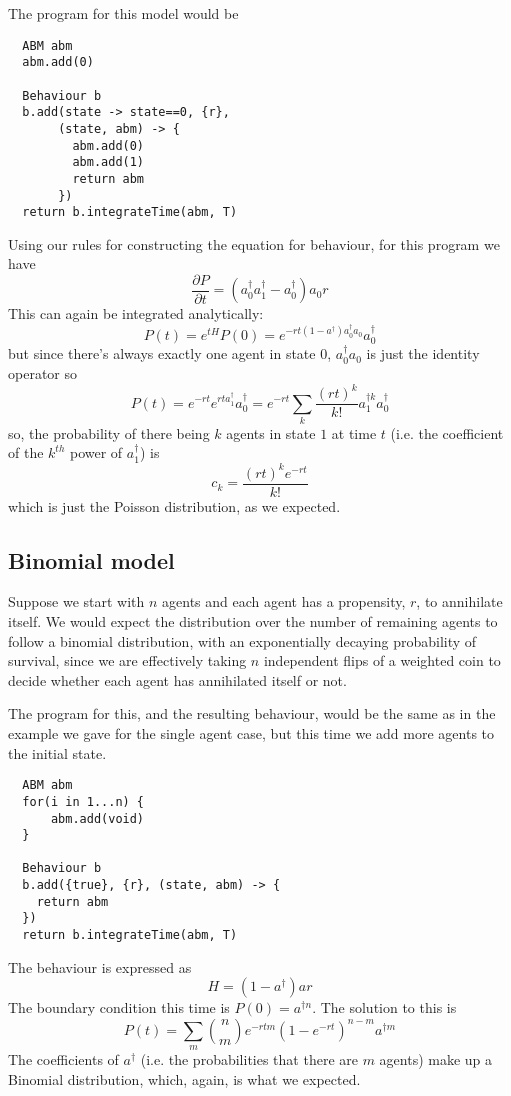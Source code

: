 \documentclass[letterpaper,twocolumn,10pt]{article}
\begin{document}
The program for this model would be

\begin{lstlisting}
  ABM abm
  abm.add(0)
  
  Behaviour b
  b.add(state -> state==0, {r}, 
       (state, abm) -> {
         abm.add(0)
         abm.add(1)
         return abm
       })
  return b.integrateTime(abm, T)
\end{lstlisting}
Using our rules for constructing the equation for behaviour, for this program we have
\[
\frac{\partial P}{\partial t} = (a_0^\dag a_1^\dag - a_0^\dag)a_0r
\]
This can again be integrated analytically:
\[
P(t) = e^{tH}P(0) = e^{-rt (1-a^\dag)a_0^\dag a_0}a_0^\dag
\]
but since there's always exactly one agent in state $0$, $a_0^\dag a_0$ is just the identity operator so
\[
P(t)  = e^{-rt}e^{rta_1^\dag}a_0^\dag = e^{-rt}\sum_k \frac{(rt)^k}{k!}a_1^{\dag k} a_0^\dag
\]
so, the probability of there being $k$ agents in state $1$ at time $t$ (i.e. the coefficient of the $k^{th}$ power of $a_1^\dag$) is 
\[
c_k = \frac{(rt)^ke^{-rt}}{k!}
\]
which is just the Poisson distribution, as we expected.

\subsection{Binomial model}
Suppose we start with $n$ agents and each agent has a propensity, $r$, to annihilate itself. We would expect the distribution over the number of remaining agents to follow a binomial distribution, with an exponentially decaying probability of survival, since we are effectively taking $n$ independent flips of a weighted coin to decide whether each agent has annihilated itself or not.

The program for this, and the resulting behaviour, would be the same as in the example we gave for the single agent case, but this time we add more agents to the initial state.

\begin{lstlisting}
  ABM abm
  for(i in 1...n) {
	  abm.add(void)
  }
  
  Behaviour b
  b.add({true}, {r}, (state, abm) -> {
    return abm
  })
  return b.integrateTime(abm, T)
\end{lstlisting}

The behaviour is expressed as
\[
H = (1 - a^\dag)ar
\]
The boundary condition this time is $P(0) = a^{\dag n}$. The solution to this is
\[
P(t) = \sum_m{n\choose m}e^{-rtm}(1-e^{-rt})^{n-m}a^{\dag m}
\]
The coefficients of $a^\dag$ (i.e. the probabilities that there are $m$ agents) make up a Binomial distribution, which, again, is what we expected.
\end{document}
